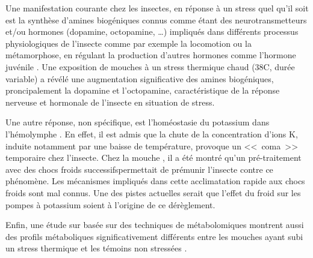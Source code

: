 		Une manifestation courante chez les insectes, en réponse à un stress quel qu'il soit est la synthèse d'amines biogéniques connus comme étant des neurotransmetteurs et/ou hormones (dopamine, octopamine, \ldots) impliqués dans différents processus physiologiques de l'insecte comme par exemple la locomotion ou la métamorphose, en régulant la production d'autres hormones comme l'hormone juvénile \cite{hirashima2000}.
		Une exposition de mouches  à un stress thermique chaud (38\textdegree{}C, durée variable) a révélé une augmentation significative des amines biogéniques, proncipalement la dopamine et l'octopamine, caractéristique de la réponse nerveuse et hormonale de l'insecte en situation de stress.

		Une autre réponse, non spécifique, est l'homéostasie du potassium dans l'hémolymphe \cite{armstrong2012}.
		En effet, il est admis que la chute de la concentration d'ions K\up{+}, induite notamment par une baisse de température, provoque un <<~coma~>> temporaire chez l'insecte.
		Chez la mouche , il a été montré qu'un pré-traitement avec des chocs froids successifspermettait de prémunir l'insecte contre ce phénomène.
		Les mécanismes impliqués dans cette acclimatation rapide aux chocs froids sont mal connus.
		Une des pistes actuelles serait que l'effet du froid sur les pompes à potassium soient à l'origine de ce dérèglement.

		Enfin, une étude sur  basée sur des techniques de métabolomiques montrent aussi des profils métaboliques significativement différents entre les mouches ayant subi un stress thermique et les témoins non stressées \cite{malmendal2006}.

